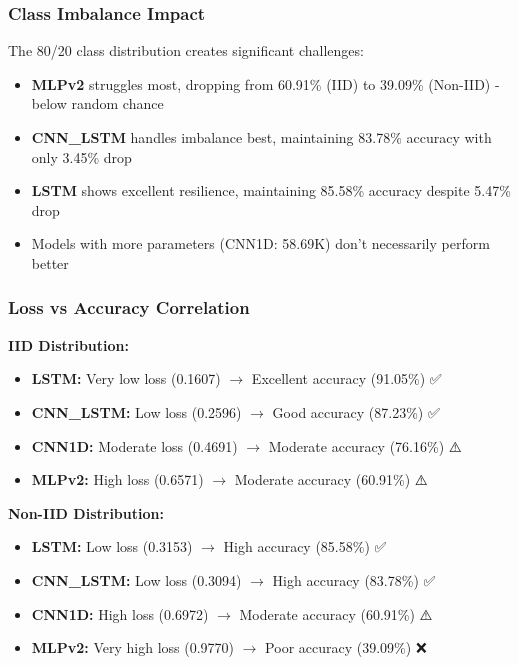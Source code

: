 \documentclass[12pt,a4paper]{article}
\begin{document}
\subsubsection{Class Imbalance Impact}

The 80/20 class distribution creates significant challenges:

\begin{itemize}
    \item \textbf{MLPv2} struggles most, dropping from 60.91\% (IID) to 39.09\% (Non-IID) - below random chance
    \item \textbf{CNN\_LSTM} handles imbalance best, maintaining 83.78\% accuracy with only 3.45\% drop
    \item \textbf{LSTM} shows excellent resilience, maintaining 85.58\% accuracy despite 5.47\% drop
    \item Models with more parameters (CNN1D: 58.69K) don't necessarily perform better
\end{itemize}

\subsubsection{Loss vs Accuracy Correlation}

\textbf{IID Distribution:}
\begin{itemize}
    \item \textbf{LSTM:} Very low loss (0.1607) $\rightarrow$ Excellent accuracy (91.05\%) ✅
    \item \textbf{CNN\_LSTM:} Low loss (0.2596) $\rightarrow$ Good accuracy (87.23\%) ✅
    \item \textbf{CNN1D:} Moderate loss (0.4691) $\rightarrow$ Moderate accuracy (76.16\%) ⚠️
    \item \textbf{MLPv2:} High loss (0.6571) $\rightarrow$ Moderate accuracy (60.91\%) ⚠️
\end{itemize}

\textbf{Non-IID Distribution:}
\begin{itemize}
    \item \textbf{LSTM:} Low loss (0.3153) $\rightarrow$ High accuracy (85.58\%) ✅
    \item \textbf{CNN\_LSTM:} Low loss (0.3094) $\rightarrow$ High accuracy (83.78\%) ✅
    \item \textbf{CNN1D:} High loss (0.6972) $\rightarrow$ Moderate accuracy (60.91\%) ⚠️
    \item \textbf{MLPv2:} Very high loss (0.9770) $\rightarrow$ Poor accuracy (39.09\%) ❌
\end{itemize}
\end{document}
